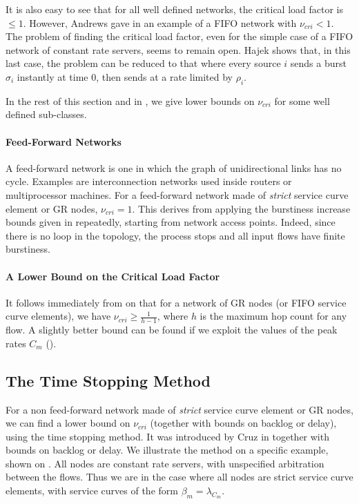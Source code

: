 It is also easy to see that for all well defined networks, the
critical load factor is $\leq 1$. However, Andrews gave in
\cite{andrews00} an example of a FIFO network with $\nu_{cri} <
1$. The problem of finding the critical load factor, even for the
simple case of a FIFO network of constant rate servers, seems to
remain open. Hajek \cite{hajek2000} shows that, in this last case,
the problem can be reduced to that where every source $i$ sends a
burst $\sigma_i$ instantly at time $0$, then sends at a rate
limited by $\rho_i$.

In the rest of this section and in , we give
lower bounds on $\nu_{cri}$ for some well defined sub-classes.

\paragraph{Feed-Forward Networks}
A feed-forward network is one in which the graph of unidirectional
links has no cycle. Examples are interconnection networks used
inside routers or multiprocessor machines. For a feed-forward
network made of \emph{strict} service curve element or GR nodes,
$\nu_{cri}=1$. This derives from applying the burstiness increase
bounds given in  repeatedly, starting from
network access points. Indeed, since there is no loop in the
topology, the process stops and all input flows have finite
burstiness.

\paragraph{A Lower Bound on the Critical Load Factor}
It follows immediately from  on
 that for a network of GR nodes (or FIFO
service curve elements), we have $\nu_{cri} \geq \frac{1}{h-1}$,
where $h$ is the maximum hop count for any flow. A slightly better
bound can be found if we exploit the values of the peak rates
$C_m$ ().


\subsection{The Time Stopping Method}
 

For a non feed-forward network made of \emph{strict} service curve
element or GR nodes, we can find a lower bound on $\nu_{cri}$
(together with bounds on backlog or delay), using the time
stopping method. It was introduced by Cruz in \cite{cru91b}
together with bounds on backlog or delay. We illustrate the method
on a specific example, shown on . All nodes are
constant rate servers, with unspecified arbitration between the
flows. Thus we are in the case where all nodes are strict service
curve elements, with service curves of the form $\beta_m=
\lambda_{C_m}$.

